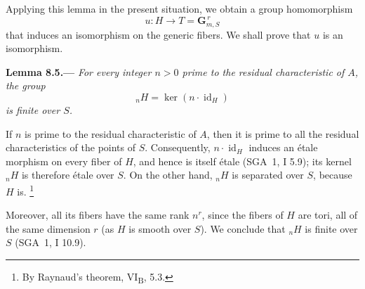 Applying this lemma in the present situation, we obtain a group
homomorphism
\[
  u:H\longrightarrow T=\mathbf{G}_{m,S}^{\,r}
\]
that induces an isomorphism on the generic fibers. We shall prove that
\(u\) is an isomorphism.

\par\medskip\noindent{}\textbf{Lemma 8.5.---}\enspace
\emph{For every integer \(n>0\) prime to the residual characteristic of
\(A\), the group
\[
  {}_nH=\ker(n\cdot\operatorname{id}_H)
\]
is finite over \(S\).}

If \(n\) is prime to the residual characteristic of \(A\), then it is
prime to all the residual characteristics of the points of \(S\).
Consequently, \(n\cdot\operatorname{id}_H\) induces an étale morphism on
every fiber of \(H\), and hence is itself étale (SGA~1, I 5.9); its kernel
\({}_nH\) is therefore étale over \(S\). On the other hand, \({}_nH\) is
separated over \(S\), because \(H\) is.
\begingroup
\renewcommand{\thefootnote}{\(\ast\)}
\footnote{By Raynaud's theorem, VI\textsubscript{B}, 5.3.}
\endgroup
\addtocounter{footnote}{-1}%
Moreover, all its fibers have the same rank \(n^r\), since the fibers of
\(H\) are tori, all of the same dimension \(r\) (as \(H\) is smooth over
\(S\)). We conclude that \({}_nH\) is finite over \(S\) (SGA~1, I 10.9).


